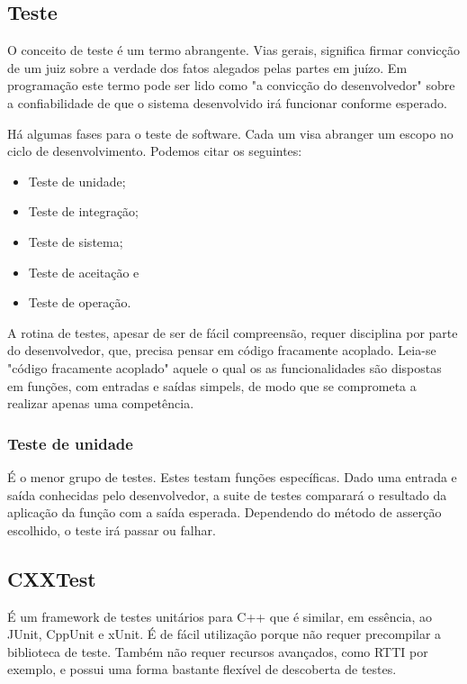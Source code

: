 \documentclass[
	article,			%
	12pt,				%
	oneside,			%
	a4paper,			%
	english,			%
	brazil,				%
	sumario=tradicional
	]{abntex2}
\begin{document}
\subsection{Teste}

O conceito de teste é um termo abrangente. Vias gerais, significa firmar convicção de um juiz sobre a verdade dos fatos alegados pelas partes em juízo. Em programação este termo pode ser lido como "a convicção do desenvolvedor" sobre a confiabilidade de que o sistema desenvolvido irá funcionar conforme esperado.

Há algumas fases para o teste de software. Cada um visa abranger um escopo no ciclo de desenvolvimento. Podemos citar os seguintes:
\begin{itemize}
	\item Teste de unidade;
	\item Teste de integração;
	\item Teste de sistema;
	\item Teste de aceitação e
	\item Teste de operação.
\end{itemize}

A rotina de testes, apesar de ser de fácil compreensão, requer disciplina por parte do desenvolvedor, que, precisa pensar em código fracamente acoplado. Leia-se "código fracamente acoplado" aquele o qual os as funcionalidades são dispostas em funções, com entradas e saídas simpels, de modo que se comprometa a realizar apenas uma competência.

\subsubsection{Teste de unidade}

É o menor grupo de testes. Estes testam funções específicas. Dado uma entrada e saída conhecidas pelo desenvolvedor, a suite de testes comparará o resultado da aplicação da função com a saída esperada. Dependendo do método de asserção escolhido, o teste irá passar ou falhar.

\subsection{CXXTest}
É um framework de testes unitários para C++ que é similar, em essência, ao JUnit, CppUnit e xUnit. É de fácil utilização porque não requer precompilar a biblioteca de teste. Também não requer recursos avançados, como RTTI por exemplo, e possui uma forma bastante flexível de descoberta de testes.
\end{document}
